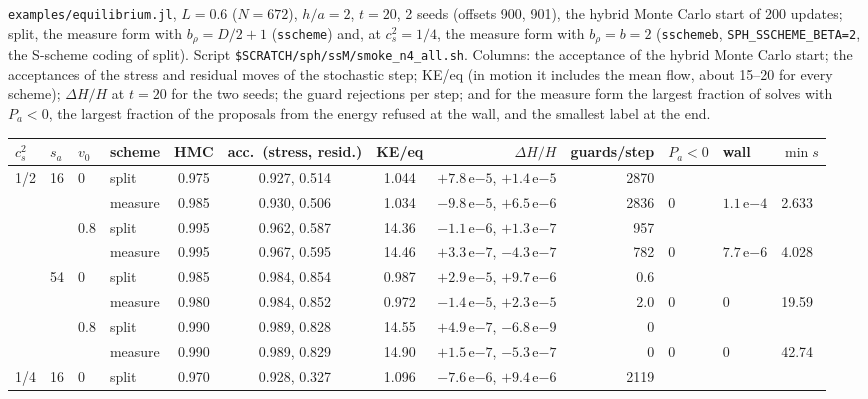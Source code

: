 \documentclass[11pt,aps,preprint,nofootinbib,superscriptaddress,tightenlines]{revtex4-2}
\begin{document}
\nolinkurl{examples/equilibrium.jl}, $L=0.6$ ($N=672$), $h/a=2$, $t=20$, 2 seeds (offsets 900, 901), the hybrid Monte Carlo start of 200 updates;
split, the measure form with $b_\rho=D/2+1$ (\texttt{sscheme}) and, at $c_s^2=1/4$, the measure form with $b_\rho=b=2$ (\texttt{sschemeb},
\texttt{SPH\_SSCHEME\_BETA=2}, the S-scheme coding of split).  Script \texttt{\$SCRATCH/sph/ssM/smoke\_n4\_all.sh}.  Columns: the acceptance of the
hybrid Monte Carlo start; the acceptances of the stress and residual moves of the stochastic step; KE/eq (in motion it includes the mean flow, about
15--20 for every scheme); $\Delta H/H$ at $t=20$ for the two seeds; the guard rejections per step; and for the measure form the largest fraction of
solves with $P_a<0$, the largest fraction of the proposals from the energy refused at the wall, and the smallest label at the end.
\begin{center}\scriptsize
\begin{tabular}{llll|ccc|r|r|lll}
\toprule
$c_s^2$ & $s_a$ & $v_0$ & scheme & HMC & acc.\ (stress, resid.) & KE/eq & $\Delta H/H$ & guards/step & $P_a<0$ & wall & $\min s$ \\
\midrule
1/2 & 16 & 0 & split & 0.975 & 0.927, 0.514 & 1.044 & $+7.8\,\mathrm e{-5}$, $+1.4\,\mathrm e{-5}$ & 2870 & & & \\
 & & & measure & 0.985 & 0.930, 0.506 & 1.034 & $-9.8\,\mathrm e{-5}$, $+6.5\,\mathrm e{-6}$ & 2836 & 0 & $1.1\,\mathrm e{-4}$ & 2.633 \\
 & & 0.8 & split & 0.995 & 0.962, 0.587 & 14.36 & $-1.1\,\mathrm e{-6}$, $+1.3\,\mathrm e{-7}$ & 957 & & & \\
 & & & measure & 0.995 & 0.967, 0.595 & 14.46 & $+3.3\,\mathrm e{-7}$, $-4.3\,\mathrm e{-7}$ & 782 & 0 & $7.7\,\mathrm e{-6}$ & 4.028 \\
 & 54 & 0 & split & 0.985 & 0.984, 0.854 & 0.987 & $+2.9\,\mathrm e{-5}$, $+9.7\,\mathrm e{-6}$ & 0.6 & & & \\
 & & & measure & 0.980 & 0.984, 0.852 & 0.972 & $-1.4\,\mathrm e{-5}$, $+2.3\,\mathrm e{-5}$ & 2.0 & 0 & 0 & 19.59 \\
 & & 0.8 & split & 0.990 & 0.989, 0.828 & 14.55 & $+4.9\,\mathrm e{-7}$, $-6.8\,\mathrm e{-9}$ & 0 & & & \\
 & & & measure & 0.990 & 0.989, 0.829 & 14.90 & $+1.5\,\mathrm e{-7}$, $-5.3\,\mathrm e{-7}$ & 0 & 0 & 0 & 42.74 \\
\midrule
1/4 & 16 & 0 & split & 0.970 & 0.928, 0.327 & 1.096 & $-7.6\,\mathrm e{-6}$, $+9.4\,\mathrm e{-6}$ & 2119 & & & \\

\end{tabular}
\end{center}
\end{document}
